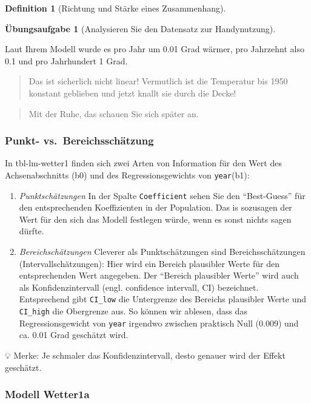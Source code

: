 \documentclass[
  a4paper,
  DIV=11]{scrreprt}
\theoremstyle{definition}
\newtheorem{exercise}{Übungsaufgabe}[chapter]
\theoremstyle{definition}
\theoremstyle{definition}
\newtheorem{definition}{Definition}[chapter]
\theoremstyle{remark}
\begin{document}
\begin{definition}[Richtung und Stärke eines
Zusammenhang]
\begin{exercise}[Analysieren Sie den Datensatz zur
Handynutzung]
\begin{longtable}[]
\end{longtable}

Laut Ihrem Modell wurde es pro Jahr um 0.01 Grad wärmer, pro Jahrzehnt
also 0.1 und pro Jahrhundert 1 Grad.

\begin{quote}
{} Das ist sicherlich nicht linear! Vermutlich ist die
Temperatur bis 1950 konstant geblieben und jetzt knallt sie durch die
Decke!
\end{quote}

\begin{quote}
{} Mit der Ruhe, das schauen Sie sich später an.
\end{quote}

\subsubsection{Punkt-
vs.~Bereichsschätzung}\label{punkt--vs.-bereichsschuxe4tzung}

In tbl-lm-wetter1 finden sich zwei Arten von Information für den Wert
des Achsenabschnitts (b0) und des Regressionsgewichts von
\texttt{year}(b1):

\begin{enumerate}
\def\labelenumi{\arabic{enumi}.}
\item
  \emph{Punktschätzungen} In der Spalte \texttt{Coefficient} sehen Sie
  den ``Best-Guess'' für den entsprechenden Koeffizienten in der
  Population. Das is sozusagen der Wert für den sich das Modell
  festlegen würde, wenn es sonst nichts sagen dürfte.
\item
  \emph{Bereichschätzungen} Cleverer als Punktschätzungen sind
  Bereichsschätzungen (Intervallschätzungen): Hier wird ein Bereich
  plausibler Werte für den entsprechenden Wert angegeben. Der ``Bereich
  plausibler Werte'' wird auch als Konfidenzintervall (engl. confidence
  intervall, CI) bezeichnet. Entsprechend gibt \texttt{CI\_low} die
  Untergrenze des Bereichs plausibler Werte und \texttt{CI\_high} die
  Obergrenze aus. So können wir ablesen, dass das Regressionsgewicht von
  \texttt{year} irgendwo zwischen praktisch Null (0.009) und ca. 0.01
  Grad geschätzt wird.
\end{enumerate}

💡 Merke: Je schmaler das Konfidenzintervall, desto genauer wird der
Effekt geschätzt.

\subsubsection{Modell Wetter1a}\label{modell-wetter1a}


\end{exercise}
\end{definition}
\end{document}
